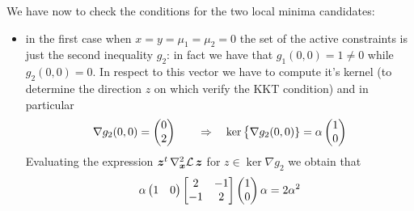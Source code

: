 \begin{example}{}
		We have now to check the conditions for the two local minima candidates:
		\begin{itemize}
			\item in the first case when $x=y = \mu_1 = \mu_2 = 0$ the set of the active constraints is just the second inequality $g_2$: in fact we have that $g_1(0,0) = 1 \neq 0$ while $g_2(0,0) = 0$. In respect to this vector we have to compute it's kernel (to determine the direction $z$ on which verify the KKT condition) and in particular
			\[ \nabla g_2(0,0) = \begin{pmatrix} 0\\ 2 \end{pmatrix} \qquad \Rightarrow \quad \ker\big\{ \nabla g_2(0,0) \} = \alpha \begin{pmatrix} 1 \\ 0 \end{pmatrix} \]
			Evaluating the expression $\boldsymbol{z}^t \, \nabla_{\boldsymbol{x}}^2\mathcal L \, \boldsymbol{z}$ for $z\in \ker{\nabla g_2}$ we obtain that
			\[ \alpha \begin{pmatrix} 1 & 0 \end{pmatrix} \begin{bmatrix}  2 & - 1 \\ - 1 & 2  \end{bmatrix} \begin{pmatrix} 1 \\ 0 \end{pmatrix} \alpha = 2\alpha^2  \]
		\end{itemize}
		
	\end{example}
	
	
	
	
	
	
	
	
	
	
	
	
	
	
	
	
	
	
	
	
	
	
	
	
	
	
	
	
	
	
	
	
	
	
	
	
	
	
	
	
	
	
	